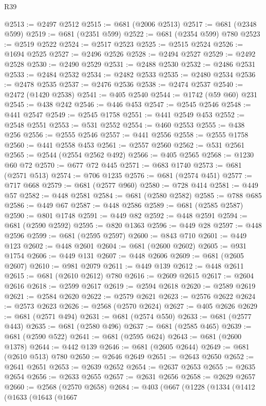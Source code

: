 \begin{lexlean}{R39}
\begin{coremodule}
@2513 := @2497 @2512
@2515 := @681 (@2006 @2513)
@2517 := @681 (@2348 @599)
@2519 := @681 (@2351 @599)
@2522 := @681 (@2354 @599) @780
@2523 := @2519 @2522
@2524 := @2517 @2523
@2525 := @2515 @2524
@2526 := @1694 @2525
@2527 := @2496 @2526
@2528 := @2494 @2527
@2529 := @2492 @2528
@2530 := @2490 @2529
@2531 := @2488 @2530
@2532 := @2486 @2531
@2533 := @2484 @2532
@2534 := @2482 @2533
@2535 := @2480 @2534
@2536 := @2478 @2535
@2537 := @2476 @2536
@2538 := @2474 @2537
@2540 := @2472 (@1420 @2538)
@2541 := @405 @2540
@2544 := @1742 (@59 @60) @231
@2545 := @438 @242
@2546 := @446 @453
@2547 := @2545 @2546
@2548 := @441 @2547
@2549 := @2545 @1758
@2551 := @441 @2549 @453
@2552 := @2548 @2551
@2553 := @531 @2552
@2554 := @460 @2553
@2555 := @438 @256
@2556 := @2555 @2546
@2557 := @441 @2556
@2558 := @2555 @1758
@2560 := @441 @2558 @453
@2561 := @2557 @2560
@2562 := @531 @2561
@2565 := @2544 (@2554 @2562 @492)
@2566 := @405 @2565
@2568 := @1230 @60 @72
@2570 := @677 @72 @445
@2571 := @683 @1740
@2573 := @681 (@2571 @513)
@2574 := @706 @1235
@2576 := @681 (@2574 @451)
@2577 := @717 @668
@2579 := @681 (@2577 @960)
@2580 := @728 @414
@2581 := @449 @57
@2582 := @448 @2581
@2584 := @681 (@2580 @2582)
@2585 := @788 @685
@2586 := @449 @67
@2587 := @448 @2586
@2589 := @681 (@2585 @2587)
@2590 := @801 @1748
@2591 := @449 @82
@2592 := @448 @2591
@2594 := @681 (@2590 @2592)
@2595 := @820 @1363
@2596 := @449 @28
@2597 := @448 @2596
@2599 := @681 (@2595 @2597)
@2600 := @843 @710
@2601 := @449 @123
@2602 := @448 @2601
@2604 := @681 (@2600 @2602)
@2605 := @931 @1754
@2606 := @449 @131
@2607 := @448 @2606
@2609 := @681 (@2605 @2607)
@2610 := @981 @2079
@2611 := @449 @139
@2612 := @448 @2611
@2615 := @681 (@2610 @2612) @780
@2616 := @2609 @2615
@2617 := @2604 @2616
@2618 := @2599 @2617
@2619 := @2594 @2618
@2620 := @2589 @2619
@2621 := @2584 @2620
@2622 := @2579 @2621
@2623 := @2576 @2622
@2624 := @2573 @2623
@2626 := @2568 (@2570 @2624)
@2627 := @405 @2626
@2629 := @681 (@2571 @494)
@2631 := @681 (@2574 @550)
@2633 := @681 (@2577 @443)
@2635 := @681 (@2580 @496)
@2637 := @681 (@2585 @465)
@2639 := @681 (@2590 @522)
@2641 := @681 (@2595 @624)
@2643 := @681 (@2600 @1378)
@2644 := @442 @139
@2646 := @681 (@2605 @2644)
@2649 := @681 (@2610 @513) @780
@2650 := @2646 @2649
@2651 := @2643 @2650
@2652 := @2641 @2651
@2653 := @2639 @2652
@2654 := @2637 @2653
@2655 := @2635 @2654
@2656 := @2633 @2655
@2657 := @2631 @2656
@2658 := @2629 @2657
@2660 := @2568 (@2570 @2658)
@2684 := @403
    (@667
      (@1228
        (@1334
          (@1412
            (@1633
              (@1643
                (@1667

\end{coremodule}
\end{lexlean}
